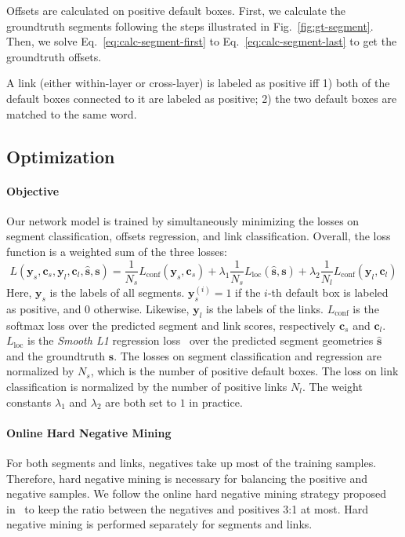 \documentclass[10pt,twocolumn,letterpaper]{article}
\begin{document}
Offsets are calculated on positive default boxes.
First, we calculate the groundtruth segments following the steps illustrated in Fig.~\ref{fig:gt-segment}.
Then, we solve Eq.~\ref{eq:calc-segment-first} to Eq.~\ref{eq:calc-segment-last} to get the groundtruth offsets.

A link (either within-layer or cross-layer) is labeled as positive iff 1) both of the default boxes connected to it are labeled as positive; 2) the two default boxes are matched to the same word.

\subsection{Optimization}

\paragraph{Objective}
Our network model is trained by simultaneously minimizing the losses on segment classification, offsets regression, and link classification. Overall, the loss function is a weighted sum of the three losses:
\begin{dmath}
  L(\mathbf{y}_s, \mathbf{c}_s, \mathbf{y}_l, \mathbf{c}_l, \hat{\mathbf{s}}, \mathbf{s}) = \frac{1}{N_s} L_{\mathrm{conf}} (\mathbf{y}_s, \mathbf{c}_s)
      + \lambda_1 \frac{1}{N_s} L_{\mathrm{loc}} (\hat{\mathbf{s}}, \mathbf{s})
      + \lambda_2 \frac{1}{N_l} L_{\mathrm{conf}} (\mathbf{y}_l, \mathbf{c}_l)
\end{dmath}
Here, $\mathbf{y}_s$ is the labels of all segments. $\mathbf{y}_s^{(i)}=1$ if the $i$-th default box is labeled as positive, and $0$ otherwise. Likewise, $\mathbf{y}_l$ is the labels of the links.
$L_{\mathrm{conf}}$ is the softmax loss over the predicted segment and link scores, respectively $\mathbf{c}_s$ and $\mathbf{c}_l$. $L_{\mathrm{loc}}$ is the \emph{Smooth L1} regression loss~\cite{iccv/Girshick15} over the predicted segment geometries $\hat{\mathbf{s}}$ and the groundtruth $\mathbf{s}$.
The losses on segment classification and regression are normalized by $N_{s}$, which is the number of positive default boxes.
The loss on link classification is normalized by the number of positive links $N_{l}$.
The weight constants $\lambda_1$ and $\lambda_2$ are both set to $1$ in practice.

\paragraph{Online Hard Negative Mining}
For both segments and links, negatives take up most of the training samples.
Therefore, hard negative mining is necessary for balancing the positive and negative samples.
We follow the online hard negative mining strategy proposed in~\cite{cvpr/ShrivastavaGG16} to keep the ratio between the negatives and positives 3:1 at most.
Hard negative mining is performed separately for segments and links.
\end{document}
